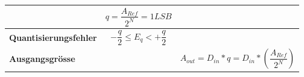 \begin{longtable}[c]{| p{6cm} | p{6cm} | p{6cm} | }
&
\begin{equation}
q = \frac{A_{Ref}}{2^N} = 1LSB
\end{equation}
\\
\hline
\begin{minipage}{6cm}
\textbf{Quantisierungsfehler}
\end{minipage}
&
\begin{equation}
-\frac{q}{2}\leq E_{q}<+\frac{q}{2}
\end{equation}
&
\\
\hline
\begin{minipage}{6cm}
\textbf{Ausgangsgrösse}
\end{minipage}
&
&
\begin{equation}
A_{out} = D_{in}*q = D_{in}*(\frac{A_{Ref}}{2^N})
\end{equation}\\
\hline
\end{longtable}
\newpage

